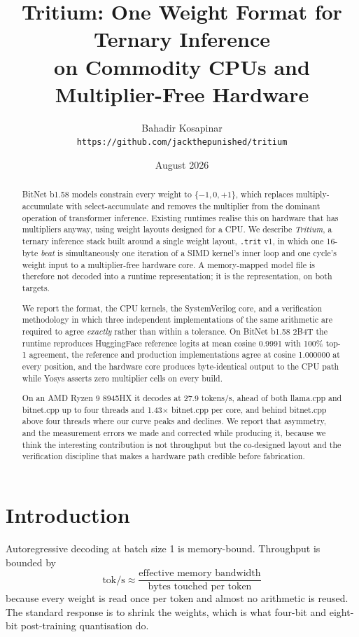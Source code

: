 \documentclass[10pt,twocolumn]{article}
\title{\vspace{-2em}\textbf{Tritium: One Weight Format for Ternary Inference\\on Commodity CPUs and Multiplier-Free Hardware}}
\author{
Bahadir Kosapinar\\
\small\texttt{https://github.com/jackthepunished/tritium}
}
\date{\small August 2026}
\begin{document}
\maketitle

\begin{abstract}
\noindent
BitNet b1.58 models constrain every weight to $\{-1, 0, +1\}$, which replaces
multiply-accumulate with select-accumulate and removes the multiplier from the
dominant operation of transformer inference. Existing runtimes realise this on
hardware that has multipliers anyway, using weight layouts designed for a CPU.
We describe \emph{Tritium}, a ternary inference stack built around a single
weight layout, \texttt{.trit} v1, in which one 16-byte \emph{beat} is
simultaneously one iteration of a SIMD kernel's inner loop and one cycle's
weight input to a multiplier-free hardware core. A memory-mapped model file is
therefore not decoded into a runtime representation; it is the representation,
on both targets.

We report the format, the CPU kernels, the SystemVerilog core, and a
verification methodology in which three independent implementations of the same
arithmetic are required to agree \emph{exactly} rather than within a tolerance.
On BitNet b1.58 2B4T the runtime reproduces HuggingFace reference logits at mean
cosine 0.9991 with 100\% top-1 agreement, the reference and production
implementations agree at cosine 1.000000 at every position, and the hardware
core produces byte-identical output to the CPU path while Yosys asserts zero
multiplier cells on every build.

On an AMD Ryzen 9 8945HX it decodes at 27.9 tokens/s, ahead of both llama.cpp
and bitnet.cpp up to four threads and 1.43$\times$ bitnet.cpp per core, and
behind bitnet.cpp above four threads where our curve peaks and declines. We
report that asymmetry, and the measurement errors we made and corrected while
producing it, because we think the interesting contribution is not throughput
but the co-designed layout and the verification discipline that makes a hardware
path credible before fabrication.
\end{abstract}

\section{Introduction}

Autoregressive decoding at batch size 1 is memory-bound. Throughput is bounded
by
\begin{equation}
\text{tok/s} \approx \frac{\text{effective memory bandwidth}}{\text{bytes touched per token}}
\end{equation}
because every weight is read once per token and almost no arithmetic is reused.
The standard response is to shrink the weights, which is what four-bit and
eight-bit post-training quantisation do.
\end{document}
